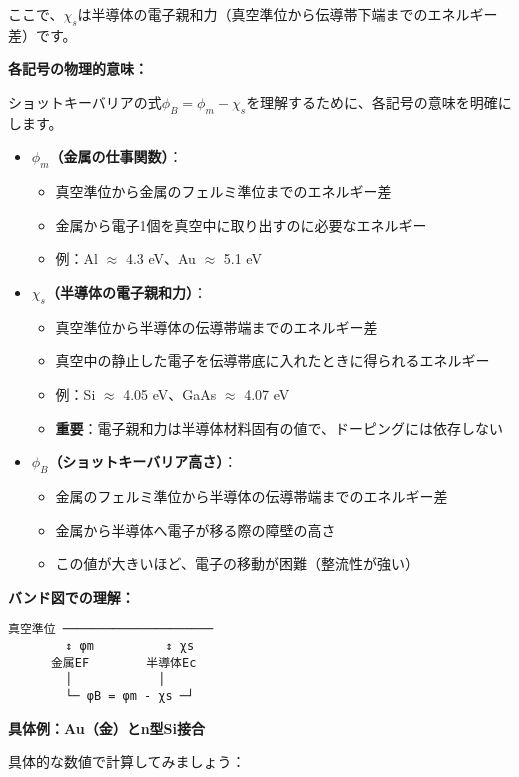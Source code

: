 ここで、$\chi_s$は半導体の電子親和力（真空準位から伝導帯下端までのエネルギー差）です。

\textbf{各記号の物理的意味：}

ショットキーバリアの式$\phi_B = \phi_m - \chi_s$を理解するために、各記号の意味を明確にします。

\begin{itemize}
\item \textbf{$\phi_m$（金属の仕事関数）}：
\begin{itemize}
\item 真空準位から金属のフェルミ準位までのエネルギー差
\item 金属から電子1個を真空中に取り出すのに必要なエネルギー
\item 例：Al $\approx$ 4.3 eV、Au $\approx$ 5.1 eV
\end{itemize}

\item \textbf{$\chi_s$（半導体の電子親和力）}：
\begin{itemize}
\item 真空準位から半導体の伝導帯端までのエネルギー差
\item 真空中の静止した電子を伝導帯底に入れたときに得られるエネルギー
\item 例：Si $\approx$ 4.05 eV、GaAs $\approx$ 4.07 eV
\item \textbf{重要}：電子親和力は半導体材料固有の値で、ドーピングには依存しない
\end{itemize}

\item \textbf{$\phi_B$（ショットキーバリア高さ）}：
\begin{itemize}
\item 金属のフェルミ準位から半導体の伝導帯端までのエネルギー差
\item 金属から半導体へ電子が移る際の障壁の高さ
\item この値が大きいほど、電子の移動が困難（整流性が強い）
\end{itemize}
\end{itemize}

\textbf{バンド図での理解：}

\begin{verbatim}
真空準位 ─────────────────────
        ↕ φm          ↕ χs
      金属EF        半導体Ec
        │            │
        └─ φB = φm - χs ─┘
\end{verbatim}

\textbf{具体例：Au（金）とn型Si接合}

具体的な数値で計算してみましょう：

